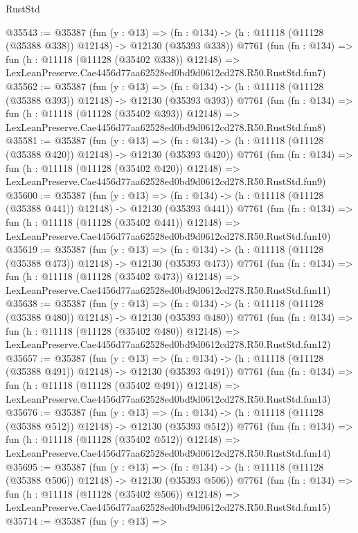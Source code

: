 \begin{lexlean}{RustStd}
\begin{coremodule}
@35543 := @35387
    (fun (y : @13) =>
    (fn : @134) -> (h : @11118 (@11128 (@35388 @338)) @12148) -> @12130 (@35393 @338))
    @7761
    (fun (fn : @134) =>
    fun (h : @11118 (@11128 (@35402 @338)) @12148) =>
    LexLeanPreserve.Cae4456d77aa62528ed0bd9d0612cd278.R50.RustStd.fun7)
@35562 := @35387
    (fun (y : @13) =>
    (fn : @134) -> (h : @11118 (@11128 (@35388 @393)) @12148) -> @12130 (@35393 @393))
    @7761
    (fun (fn : @134) =>
    fun (h : @11118 (@11128 (@35402 @393)) @12148) =>
    LexLeanPreserve.Cae4456d77aa62528ed0bd9d0612cd278.R50.RustStd.fun8)
@35581 := @35387
    (fun (y : @13) =>
    (fn : @134) -> (h : @11118 (@11128 (@35388 @420)) @12148) -> @12130 (@35393 @420))
    @7761
    (fun (fn : @134) =>
    fun (h : @11118 (@11128 (@35402 @420)) @12148) =>
    LexLeanPreserve.Cae4456d77aa62528ed0bd9d0612cd278.R50.RustStd.fun9)
@35600 := @35387
    (fun (y : @13) =>
    (fn : @134) -> (h : @11118 (@11128 (@35388 @441)) @12148) -> @12130 (@35393 @441))
    @7761
    (fun (fn : @134) =>
    fun (h : @11118 (@11128 (@35402 @441)) @12148) =>
    LexLeanPreserve.Cae4456d77aa62528ed0bd9d0612cd278.R50.RustStd.fun10)
@35619 := @35387
    (fun (y : @13) =>
    (fn : @134) -> (h : @11118 (@11128 (@35388 @473)) @12148) -> @12130 (@35393 @473))
    @7761
    (fun (fn : @134) =>
    fun (h : @11118 (@11128 (@35402 @473)) @12148) =>
    LexLeanPreserve.Cae4456d77aa62528ed0bd9d0612cd278.R50.RustStd.fun11)
@35638 := @35387
    (fun (y : @13) =>
    (fn : @134) -> (h : @11118 (@11128 (@35388 @480)) @12148) -> @12130 (@35393 @480))
    @7761
    (fun (fn : @134) =>
    fun (h : @11118 (@11128 (@35402 @480)) @12148) =>
    LexLeanPreserve.Cae4456d77aa62528ed0bd9d0612cd278.R50.RustStd.fun12)
@35657 := @35387
    (fun (y : @13) =>
    (fn : @134) -> (h : @11118 (@11128 (@35388 @491)) @12148) -> @12130 (@35393 @491))
    @7761
    (fun (fn : @134) =>
    fun (h : @11118 (@11128 (@35402 @491)) @12148) =>
    LexLeanPreserve.Cae4456d77aa62528ed0bd9d0612cd278.R50.RustStd.fun13)
@35676 := @35387
    (fun (y : @13) =>
    (fn : @134) -> (h : @11118 (@11128 (@35388 @512)) @12148) -> @12130 (@35393 @512))
    @7761
    (fun (fn : @134) =>
    fun (h : @11118 (@11128 (@35402 @512)) @12148) =>
    LexLeanPreserve.Cae4456d77aa62528ed0bd9d0612cd278.R50.RustStd.fun14)
@35695 := @35387
    (fun (y : @13) =>
    (fn : @134) -> (h : @11118 (@11128 (@35388 @506)) @12148) -> @12130 (@35393 @506))
    @7761
    (fun (fn : @134) =>
    fun (h : @11118 (@11128 (@35402 @506)) @12148) =>
    LexLeanPreserve.Cae4456d77aa62528ed0bd9d0612cd278.R50.RustStd.fun15)
@35714 := @35387
    (fun (y : @13) =>

\end{coremodule}
\end{lexlean}
